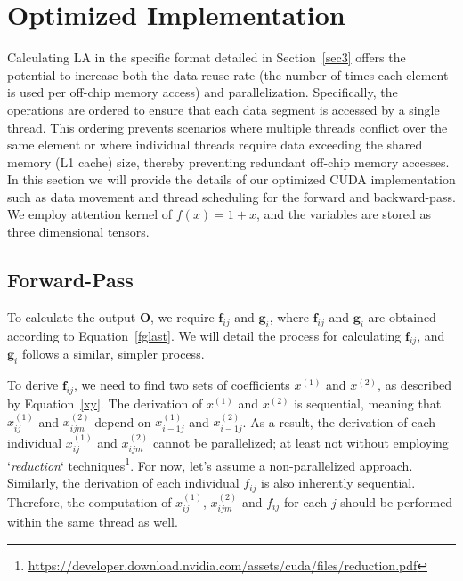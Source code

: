 \section{Optimized Implementation}
\label{sec4}
Calculating LA in the specific format detailed in Section~\ref{sec3} offers the potential to increase both the data reuse rate (the number of times each element is used per off-chip memory access) and parallelization. Specifically, the operations are ordered to ensure that each data segment is accessed by a single thread. This ordering prevents scenarios where multiple threads conflict over the same element or where individual threads require data exceeding the shared memory (L1 cache) size, thereby preventing redundant off-chip memory accesses. In this section we will provide the details of our optimized CUDA implementation such as data movement and thread scheduling for the forward and backward-pass. We employ attention kernel of $f(x) = 1 + x$, and the variables are stored as three dimensional tensors.

\subsection{Forward-Pass}
To calculate the output $\mathbf{O}$, we require $\mathbf{f}_{ij}$ and $\mathbf{g}_i$, where $\mathbf{f}_{ij}$ and $\mathbf{g}_i$ are obtained according to Equation~\ref{fglast}. We will detail the process for calculating $\mathbf{f}_{ij}$, and $\mathbf{g}_i$ follows a similar, simpler process. 
\par To derive $\mathbf{f}_{ij}$, we need to find two sets of coefficients $x^{(1)}$ and $x^{(2)}$, as described by Equation~\ref{xy}. The derivation of $x^{(1)}$ and $x^{(2)}$ is sequential, meaning that $x^{(1)}_{ij}$ and $x^{(2)}_{ijm}$ depend on $x^{(1)}_{i-1j}$ and $x^{(2)}_{i-1j}$. As a result, the derivation of each individual $x^{(1)}_{ij}$ and $x^{(2)}_{ijm}$ cannot be parallelized; at least not without employing `\textit{reduction}`  techniques\footnote{\url{https://developer.download.nvidia.com/assets/cuda/files/reduction.pdf}}. For now, let's assume a non-parallelized approach. Similarly, the derivation of each individual $f_{ij}$ is also inherently sequential. Therefore, the computation of $x^{(1)}_{ij}$, $x^{(2)}_{ijm}$ and $f_{ij}$ for each $j$ should be performed within the same thread as well.

